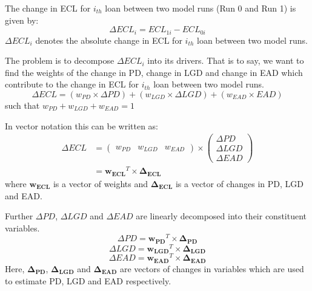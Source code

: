 \documentclass{article}
\numberwithin{equation}{section}
\begin{document}
The change in ECL for $i_{th}$ loan between two model runs (Run 0  and Run 1) is given by:
\begin{equation} \Delta ECL_{i} = ECL_{1i} - ECL_{0i} \end{equation}
$\Delta ECL_i$ denotes the absolute change in ECL for $i_{th}$ loan between two model runs.

The problem is to decompose $\Delta ECL_i$ into its drivers. That is to say, we want to find the weights of the change in PD, change in LGD and change in EAD which contribute to the change in ECL for $i_{th}$ loan between two model runs.
\begin{equation} \Delta ECL = (w_{PD} \times \Delta PD) + (w_{LGD} \times \Delta LGD) + (w_{EAD} \times EAD) \end{equation}
such that $ w_{PD} + w_{LGD} + w_{EAD} = 1$

In vector notation this can be written as:
\begin{align*}
  \Delta ECL &=
  \begin{pmatrix}
    w_{PD} & w_{LGD} & w_{EAD} 
  \end{pmatrix}
  \times 
  \begin{pmatrix}
    \Delta PD \\ \Delta LGD \\ \Delta EAD
  \end{pmatrix} \\
  &= \mathbf{w_{ECL}}^T \times \mathbf{\Delta_{ECL}}
\end{align*}
where $\mathbf{w_{ECL}}$ is a vector of weights and $\mathbf{\Delta_{ECL}}$ is a vector of changes in PD, LGD and EAD.

Further $\Delta PD$, $\Delta LGD$ and $\Delta EAD$ are linearly decomposed into their constituent variables.
\begin{equation} \Delta PD = \mathbf{w_{PD}}^T \times \mathbf{\Delta_{PD}} \end{equation}
\begin{equation} \Delta LGD = \mathbf{w_{LGD}}^T \times \mathbf{\Delta_{LGD}} \end{equation}
\begin{equation} \Delta EAD = \mathbf{w_{EAD}}^T \times \mathbf{\Delta_{EAD}} \end{equation}
Here, $\mathbf{\Delta_{PD}}$, $\mathbf{\Delta_{LGD}}$ and $\mathbf{\Delta_{EAD}}$ are vectors of changes in variables which are used to estimate PD, LGD and EAD respectively.
\end{document}
